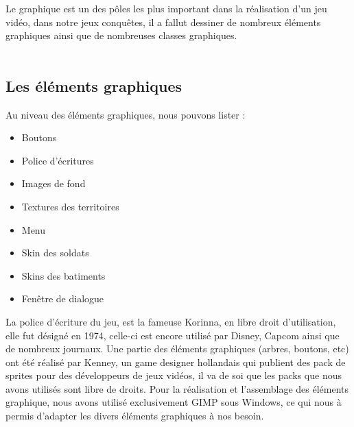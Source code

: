   Le graphique est un des pôles les plus important dans la réalisation d'un jeu vidéo, dans notre jeux conquêtes, il a fallut dessiner de nombreux éléments graphiques ainsi que de nombreuses classes graphiques.
  \\
  \\
  \subsection{Les éléments graphiques}
  Au niveau des éléments graphiques, nous pouvons lister :
  \\
  \begin{itemize}
    \item Boutons
    \item Police d'écritures
    \item Images de fond
    \item Textures des territoires
    \item Menu
    \item Skin des soldats
    \item Skins des batiments
    \item Fenêtre de dialogue\\
  \end{itemize}
  
  La police d'écriture du jeu, est la fameuse Korinna, en libre droit d'utilisation, elle fut désigné en 1974, celle-ci est encore utilisé par Disney, Capcom ainsi que de nombreux journaux.
  Une partie des éléments graphiques (arbres, boutons, etc) ont été réalisé par Kenney, un game designer hollandais qui publient des pack de sprites pour des développeurs de jeux vidéos, il va de soi que les packs que nous avons utilisés sont libre de droits.
  Pour la réalisation et l'assemblage des éléments graphique, nous avons utilisé exclusivement GIMP sous Windows, ce qui nous à permis d'adapter les divers éléments graphiques à nos besoin.
  
